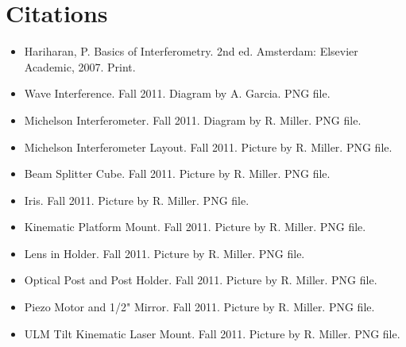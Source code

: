 \onecolumn
\section{Citations}

\begin{itemize}
\renewcommand{\labelitemi}{$\circ$}
\item Hariharan, P. Basics of Interferometry. 2nd ed. Amsterdam: Elsevier Academic, 2007. Print.
\item Wave Interference. Fall 2011. Diagram by A. Garcia. PNG file.
\item Michelson Interferometer. Fall 2011. Diagram by R. Miller. PNG file.
\item Michelson Interferometer Layout. Fall 2011. Picture by R. Miller. PNG file.
\item Beam Splitter Cube. Fall 2011. Picture by R. Miller. PNG file.
\item Iris. Fall 2011. Picture by R. Miller. PNG file.
\item Kinematic Platform Mount. Fall 2011. Picture by R. Miller. PNG file.
\item Lens in Holder. Fall 2011. Picture by R. Miller. PNG file.
\item Optical Post and Post Holder. Fall 2011. Picture by R. Miller. PNG file.
\item Piezo Motor and 1/2" Mirror. Fall 2011. Picture by R. Miller. PNG file.
\item ULM Tilt Kinematic Laser Mount. Fall 2011. Picture by R. Miller. PNG file.

\end{itemize}